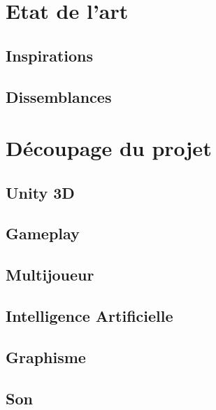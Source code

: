 \documentclass[10pt]{article} %
\begin{document}
\section{Etat de l'art}



\subsection{Inspirations}



\subsection{Dissemblances}



\section{Découpage du projet}



\subsection{Unity 3D}



\subsection{Gameplay}



\subsection{Multijoueur}



\subsection{Intelligence Artificielle}



\subsection{Graphisme}



\subsection{Son}
\end{document}
